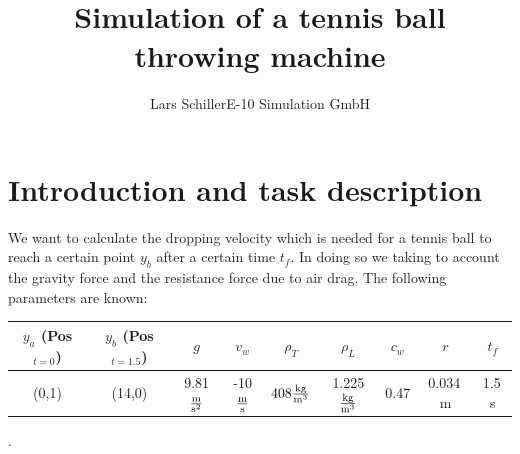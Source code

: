 \documentclass[11pt,a4paper,oneside]{scrartcl}
\author{Lars Schiller\qquad E-10 Simulation GmbH}
\title{Simulation of a tennis ball throwing machine}
\begin{document}
\maketitle


\section{Introduction and task description}

We want to calculate the dropping velocity which is needed for a tennis ball to reach a certain point $y_b$ after a certain time $t_f$. In doing so we taking to account the gravity force and the resistance force due to air drag. The following parameters are known:

\begin{center}
\begin{tabular}{cc|cc|cccc|c}
$y_a$ (Pos$_{t=0}$) & $y_b$ (Pos$_{t=1.5}$) & $g$ & $v_w$ & $\rho_T$ & $\rho_L$ & $c_w$ & $r$ & $t_f$\\ \hline
(0,1) & (14,0) & 9.81$\frac{\textnormal{m}}{\textnormal{s}^2}$ & -10$\frac{\textnormal{m}}{\textnormal{s}}$ & $408\frac{\textnormal{kg}}{\textnormal{m}^3}$ & 1.225$\frac{\textnormal{kg}}{\textnormal{m}^3}$ & 0.47 & 0.034\,m & 1.5\,s \\
\end{tabular}.
\end{center}
\end{document}
